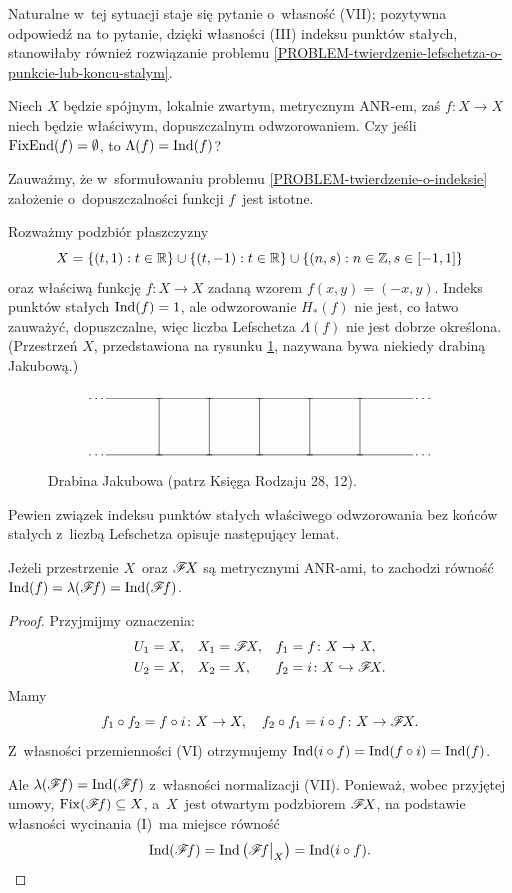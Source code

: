Naturalne w~tej sytuacji staje się pytanie o~własność (VII); pozytywna odpowiedź na to pytanie, dzięki własności (III) indeksu punktów stałych, stanowiłaby również rozwiązanie problemu \ref{PROBLEM-twierdzenie-lefschetza-o-punkcie-lub-koncu-stalym}.

\begin{problem}\label{PROBLEM-twierdzenie-o-indeksie}
Niech $X$ będzie spójnym, lokalnie zwartym, metrycznym \mbox{ANR-em}, zaś $f\colon X\to X$ niech będzie właściwym, dopuszczalnym odwzorowaniem. Czy jeśli $\operatorname{FixEnd}(f)=\emptyset$, to $\Lambda(f)=\operatorname{Ind}(f)$?
\end{problem}

Zauważmy, że w~sformułowaniu problemu \ref{PROBLEM-twierdzenie-o-indeksie} założenie o~dopuszczalności funkcji $f$~jest istotne.
\begin{ex}\label{ex-jacob-ladder}
Rozważmy podzbiór płaszczyzny \[X=\{(t,1):t\in\mathbb{R}\}\cup \{(t,-1):t\in\mathbb{R}\}\cup \{(n,s):n\in\mathbb{Z}, s\in [-1,1]\}\] oraz właściwą funkcję $f\colon X\to X$ zadaną wzorem $f(x,y)=(-x,y)$. Indeks punktów stałych $\operatorname{Ind}(f)=1$, ale odwzorowanie $H_*(f)$ nie jest, co łatwo zauważyć, dopuszczalne, więc liczba Lefschetza $\Lambda(f)$ nie jest dobrze określona. (Przestrzeń $X$, przedstawiona na rysunku \ref{fig-drabina_jakubowa}, nazywana bywa niekiedy drabiną Jakubową.)
\end{ex}

\begin{figure}[h]
\[\xymatrix@M=-2pt@R=40pt@C=40pt{\cdots\ \ar@{-}[r] & \ar@{-}[d]\ar@{-}[r] & \ar@{-}[d]\ar@{-}[r] & \ar@{-}[d]\ar@{-}[r] & \ar@{-}[d]\ar@{-}[r] & \ar@{-}[d]\ar@{-}[r] & \ \cdots\\\cdots\  \ar@{-}[r] & \ar@{-}[r] & \ar@{-}[r] & \ar@{-}[r] & \ar@{-}[r] & \ar@{-}[r] & \ \cdots }\]
\caption{Drabina Jakubowa (patrz Księga Rodzaju 28, 12).}\label{fig-drabina_jakubowa}
\end{figure}

Pewien związek indeksu punktów stałych właściwego odwzorowania bez końców stałych z~liczbą Lefschetza opisuje następujący lemat.

\begin{lem}\label{lem-indeks-rowny-liczbie-lefschetza-uzwarcenia-freudenthala}
Jeżeli przestrzenie $X$~oraz $\mathscr{F}\! X$ są metrycznymi \mbox{ANR-ami}, to zachodzi równość $\operatorname{Ind}(f)=\lambda(\mathscr{F}\! f)=\operatorname{Ind}(\mathscr{F}\! f)$.
\end{lem}
\begin{proof}
Przyjmijmy oznaczenia: \begin{align*}U_1&=X,& X_1&=\mathscr{F}\! X,& f_1&=f\colon X\to X,\\
U_2&=X,& X_2&=X,& f_2&=i\colon X\hookrightarrow \mathscr{F}\! X.\end{align*}
Mamy \[f_1\circ f_2=f\circ i\colon X\to X,\quad f_2\circ f_1=i\circ f\colon X\to \mathscr{F}\! X.\] Z~własności przemienności (VI) otrzymujemy $\operatorname{Ind}(i\circ f)=\operatorname{Ind}(f\circ i)=\operatorname{Ind}(f)$.

Ale $\lambda(\mathscr{F}\! f)=\operatorname{Ind}(\mathscr{F}\! f)$ z~własności normalizacji (VII). Ponieważ, wobec przyjętej umowy, $\operatorname{Fix}(\mathscr{F}\! f)\subseteq X$, a~$X$~jest otwartym podzbiorem $\mathscr{F}\! X$, na podstawie własności wycinania (I)~ma miejsce równość \[\operatorname{Ind}(\mathscr{F}\! f)=\operatorname{Ind}\left(\mathscr{F}\! f\big |_X\right)=\operatorname{Ind}(i\circ f).\qedhere\] 
\end{proof}

